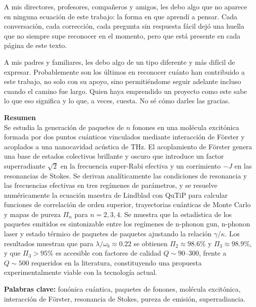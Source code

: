 A mis directores, profesores, compañeros y amigos, les debo algo que no aparece en ninguna ecuación de este trabajo: la forma en que aprendí a pensar. Cada conversación, cada corrección, cada pregunta sin respuesta fácil dejó una huella que no siempre supe reconocer en el momento, pero que está presente en cada página de este texto.

A mis padres y familiares, les debo algo de un tipo diferente y más difícil de expresar. Probablemente son los últimos en reconocer cuánto han contribuido a este trabajo, no solo con su apoyo, sino permitiéndome seguir adelante incluso cuando el camino fue largo. Quien haya emprendido un proyecto como este sabe lo que eso significa y lo que, a veces, cuesta. No sé cómo darles las gracias.

\newpage{\pagestyle{empty}\cleardoublepage}

\newpage
{}
\textbf{\LARGE Resumen}\\

Se estudia la generación de paquetes de $n$ fonones en una molécula excitónica formada por dos puntos cuánticos vinculados mediante interacción de Förster y acoplados a una nanocavidad acústica de THz. El acoplamiento de Förster genera una base de estados colectivos brillante y oscuro que introduce un factor superradiante $\sqrt{2}$ en la frecuencia super-Rabi efectiva y un corrimiento $-J$ en las resonancias de Stokes. Se derivan analíticamente las condiciones de resonancia y las frecuencias efectivas en tres regímenes de parámetros, y se resuelve numéricamente la ecuación maestra de Lindblad con QuTiP para calcular funciones de correlación de orden superior, trayectorias cuánticas de Monte Carlo y mapas de pureza $\Pi_n$ para $n=2,3,4$. Se muestra que la estadística de los paquetes emitidos es sintonizable entre los regímenes de n-phonon gun, n-phonon laser y estado térmico de paquetes de paquetes ajustando la relación $\gamma/\kappa$. Los resultados muestran que para $\lambda/\omega_b \approx 0.22$ se obtienen $\Pi_2 \approx 98.6\%$ y $\Pi_3 \approx 98.9\%$, y que $\Pi_3 > 95\%$ es accesible con factores de calidad $Q \sim 90$--$300$, frente a $Q \sim 500$ requeridos en la literatura, constituyendo una propuesta experimentalmente viable con la tecnología actual.

\vspace{0.5cm}
\textbf{\small Palabras clave: } fonónica cuántica, paquetes de fonones, molécula excitónica, interacción de Förster, resonancia de Stokes, pureza de emisión, superradiancia. \\

